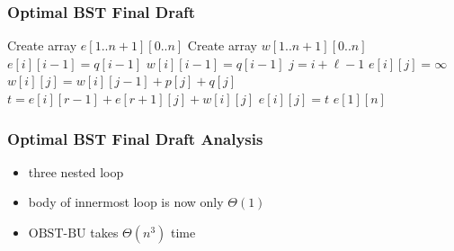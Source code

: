 \documentclass{beamer}
\begin{document}
\begin{frame} \frametitle{Optimal BST Final Draft}
  {\tiny
  \begin{algorithmic}[1]
    \State Create array $e[1..n+1][0..n]$ 
    \State Create array $w[1..n+1][0..n]$ 
      \State $e[i][i-1] = q[i-1]$ 
      \State $w[i][i-1] = q[i-1]$
    \EndFor
        \State $j = i + \ell - 1$
        \State $e[i][j] = \infty$
        \State $w[i][j] = w[i][j-1] + p[j] + q[j]$
          \State $t = e[i][r-1] + e[r+1][j] + w[i][j]$
            \State $e[i][j] = t$
          \EndIf
        \EndFor
      \EndFor
    \EndFor
    \State \Return $e[1][n]$
    \EndFunction
  \end{algorithmic}
  }
\end{frame}

\begin{frame} \frametitle{Optimal BST Final Draft Analysis}
  \begin{itemize}
    \item three nested loop
    \item body of innermost loop is now only $\Theta(1)$
    \item $\text{OBST-BU}$ takes $\Theta(n^3)$ time
  \end{itemize}
\end{frame}
\end{document}
